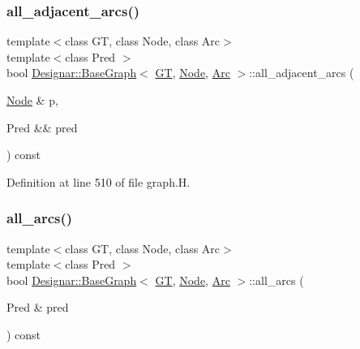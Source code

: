\subsubsection{\texorpdfstring{all\+\_\+adjacent\+\_\+arcs()}{all\_adjacent\_arcs()}\hspace{0.1cm}{\footnotesize\ttfamily [2/2]}}
{\footnotesize\ttfamily template$<$class GT, class Node, class Arc$>$ \\
template$<$class Pred $>$ \\
bool \hyperlink{class_designar_1_1_base_graph}{Designar\+::\+Base\+Graph}$<$ \hyperlink{demo-buildgraph_8_c_a3001c40d2c31ca87ed96cd7d1334a55e}{GT}, \hyperlink{namespace_designar_a5af326c65aa2bd26b26c410f2030d09e}{Node}, \hyperlink{namespace_designar_a3f55fb5513d62ff47cbc8f72b8e95d6f}{Arc} $>$\+::all\+\_\+adjacent\+\_\+arcs (\begin{DoxyParamCaption}\item[{\hyperlink{namespace_designar_a5af326c65aa2bd26b26c410f2030d09e}{Node} \&}]{p,  }\item[{Pred \&\&}]{pred }\end{DoxyParamCaption}) const\hspace{0.3cm}{\ttfamily [inline]}}



Definition at line 510 of file graph.\+H.

\mbox{\label{class_designar_1_1_base_graph_a3e2a55dafde6b1edf42f88f4c7d066b8}} 
\subsubsection{\texorpdfstring{all\+\_\+arcs()}{all\_arcs()}\hspace{0.1cm}{\footnotesize\ttfamily [1/2]}}
{\footnotesize\ttfamily template$<$class GT, class Node, class Arc$>$ \\
template$<$class Pred $>$ \\
bool \hyperlink{class_designar_1_1_base_graph}{Designar\+::\+Base\+Graph}$<$ \hyperlink{demo-buildgraph_8_c_a3001c40d2c31ca87ed96cd7d1334a55e}{GT}, \hyperlink{namespace_designar_a5af326c65aa2bd26b26c410f2030d09e}{Node}, \hyperlink{namespace_designar_a3f55fb5513d62ff47cbc8f72b8e95d6f}{Arc} $>$\+::all\+\_\+arcs (\begin{DoxyParamCaption}\item[{Pred \&}]{pred }\end{DoxyParamCaption}) const\hspace{0.3cm}{\ttfamily [inline]}}



